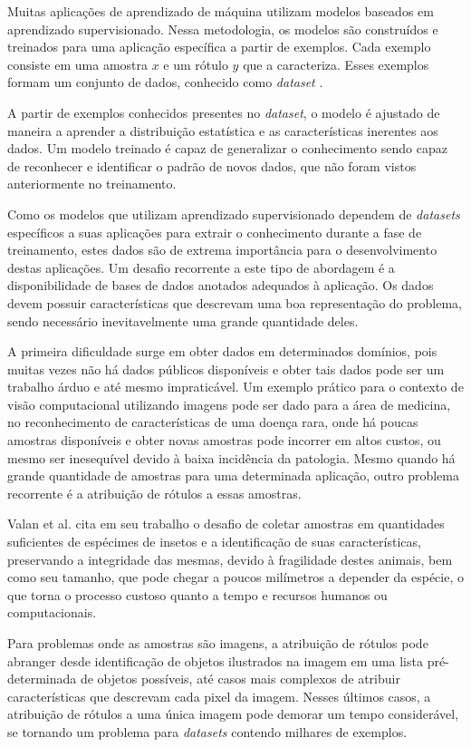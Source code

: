 \documentclass[a4paper,12pt]{article}
\begin{document}
{Muitas aplicações de aprendizado de máquina utilizam modelos baseados em aprendizado supervisionado. Nessa metodologia, os modelos são construídos e treinados para uma aplicação específica a partir de exemplos. Cada exemplo consiste em uma amostra $x$ e um rótulo $y$ que a caracteriza. Esses exemplos formam um conjunto de dados, conhecido como \emph{dataset} \cite{Goodfellow-et-al-2016}.

A partir de exemplos conhecidos presentes no \emph{dataset}, o modelo é ajustado de maneira a aprender a distribuição estatística e as características inerentes aos dados. Um modelo treinado é capaz de generalizar o conhecimento sendo capaz de reconhecer e identificar o padrão de novos dados, que não foram vistos anteriormente no treinamento. 

Como os modelos que utilizam aprendizado supervisionado dependem de \emph{datasets} específicos a suas aplicações para extrair o conhecimento durante a fase de treinamento, estes dados são de extrema importância para o desenvolvimento destas aplicações. Um desafio recorrente a este tipo de abordagem é a disponibilidade de bases de dados anotados adequados à aplicação. Os dados devem possuir características que descrevam uma boa representação do problema, sendo necessário inevitavelmente uma grande quantidade deles.

A primeira dificuldade surge em obter dados em determinados domínios, pois muitas vezes não há dados públicos disponíveis e obter tais dados pode ser um trabalho árduo e até mesmo impraticável. Um exemplo prático para o contexto de visão computacional utilizando imagens pode ser dado para a área de medicina, no reconhecimento de características de uma doença rara, onde há poucas amostras disponíveis e obter novas amostras pode incorrer em altos custos, ou mesmo ser inesequível devido à baixa incidência da patologia. Mesmo quando há grande quantidade de amostras para uma determinada aplicação, outro problema recorrente é a atribuição de rótulos a essas amostras.

Valan et al. \cite{valan2021awakening} cita em seu trabalho o desafio de coletar amostras em quantidades suficientes de espécimes de insetos e a identificação de suas características, preservando a integridade das mesmas, devido à fragilidade destes animais, bem como seu tamanho, que pode chegar a poucos milímetros a depender da espécie, o que torna o processo custoso quanto a tempo e recursos humanos ou computacionais.

Para problemas onde as amostras são imagens, a atribuição de rótulos pode abranger desde identificação de objetos ilustrados na imagem em uma lista pré-determinada de objetos possíveis, até casos mais complexos de atribuir características que descrevam cada pixel da imagem. Nesses últimos casos, a atribuição de rótulos a uma única imagem pode demorar um tempo considerável, se tornando um problema para \emph{datasets} contendo milhares de exemplos.

}
\end{document}
